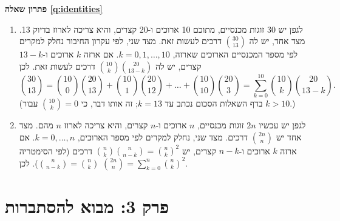 \documentclass[11pt,a4paper]{report}
\newcommand{\flag}{\tikz[baseline=-0.1ex,x=0.9ex,y=0.9ex]{\draw[line width=0.5pt] (0,-0.3)--(0,1.6); \fill (0,1.6)--(1.2,1.2)--(0,0.8)--cycle;}}
\newcounter{todo}
\newcommand{\addtodo}[1]{\refstepcounter{todo}%
  \addcontentsline{tdo}{todo}{\protect\numberline{\thetodo}#1}}
\newcommand{\needcheck}[1]{\addtodo{#1}%
  {\color{todoc}\sffamily\small\,[\textbf{\flag{}\,\thetodo\ לבדיקה:} #1]\,}}
\renewcommand{\needcheck}[1]{}
\newenvironment{solution}[1]{\par\bigskip\noindent
  {\sffamily\bfseries\color{thmc}פתרון שאלה \ref{q:#1}}\par\nopagebreak\smallskip}%
  {\par\medskip\noindent{\color{exc!50}\rule{\linewidth}{0.4pt}}\par}
\newcommand{\ans}[1]{\boxed{#1}}
\begin{document}
\begin{solution}{identities}
\begin{enumerate}[label=(\alph*)]
  \item לגפן יש 30 זוגות מכנסיים, מתוכם 10 ארוכים ו-20 קצרים, והיא צריכה לארוז בדיוק 13. מצד אחד, יש לה $\binom{30}{13}$ דרכים לעשות זאת.
  מצד שני, לפי עקרון החיבור נחלק למקרים לפי מספר המכנסיים הארוכים שארזה, $k=0,1,\dots,10$. אם ארזה $k$ ארוכים ו-$13-k$ קצרים, יש לה $\binom{10}k\binom{20}{13-k}$ דרכים לעשות זאת. לכן
  \[
    \binom{30}{13}=\binom{10}0\binom{20}{13}+\binom{10}1\binom{20}{12}+\dots+\binom{10}{10}\binom{20}3=\sum_{k=0}^{10}\binom{10}k\binom{20}{13-k}.
  \]
  (בדף השאלות הסכום נכתב עד $k=13$; זה אותו דבר, כי $\binom{10}k=0$ עבור $k>10$.)
  \item לגפן יש עכשיו $2n$ זוגות מכנסיים, $n$ ארוכים ו-$n$ קצרים, והיא צריכה לארוז $n$ מהם. מצד אחד יש $\binom{2n}n$ דרכים.
  מצד שני, נחלק למקרים לפי מספר הארוכים, $k=0,\dots,n$. אם ארזה $k$ ארוכים ו-$n-k$ קצרים, יש $\binom nk\binom n{n-k}=\binom nk^2$ דרכים (לפי הסימטריה $\binom n{n-k}=\binom nk$). לכן $\ans{\binom{2n}n=\sum_{k=0}^n\binom nk^2}$.

  \needcheck{בדף הפתרונות לא הופיע פתרון לסעיף (ב); כתבתי אותו לפי הרמז שבשאלה}
\end{enumerate}
\end{solution}

\section*{פרק 3: מבוא להסתברות}
\end{document}
